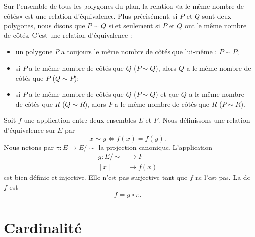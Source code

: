 \begin{example}     \label{EXooYDRVooHsANlC}
	Sur l'ensemble de tous les polygones du plan, la relation «a le même nombre de côtés» est une relation d'équivalence. Plus précisément, si \( P\) et \( Q\) sont deux polygones, nous disons que \( P\sim Q\) si et seulement si \( P\) et \( Q\) ont le même nombre de côtés. C'est une relation d'équivalence :
	\begin{itemize}
		\item
		      un polygone \( P\) a toujours le même nombre de côtés que lui-même : \( P\sim P\);
		\item
		      si \( P\) a le même nombre de côtés que \( Q\) (\( P\sim Q\)), alors \( Q\) a le même nombre de côtés que \( P\) (\( Q\sim P\));
		\item
		      si \( P\) a le même nombre de côtés que \( Q\) (\( P\sim Q\)) et que \( Q\) a le même nombre de côtés que \( R\) (\( Q\sim R\)), alors \( P\) a le même nombre de côtés que \( R\) (\( P\sim R\)).
	\end{itemize}
\end{example}

\begin{example}\label{EXooProjCanoniqueEquivAppl}
	Soit \( f\) une application entre deux ensembles \( E\) et \( F\). Nous définissons une relation d'équivalence sur \( E\) par
	\begin{equation}
		x\sim y\Leftrightarrow f(x)=f(y).
	\end{equation}
	Nous notons par \( \pi\colon E\to E/\sim\) la projection canonique. L'application
	\begin{equation}
		\begin{aligned}
			g\colon E/\sim & \to F        \\
			[x]            & \mapsto f(x)
		\end{aligned}
	\end{equation}
	est bien définie et injective. Elle n'est pas surjective tant que \( f\) ne l'est pas. La  de \( f\) est
	\begin{equation}
		f=g\circ\pi.
	\end{equation}
\end{example}

\section{Cardinalité}
\label{SECooCardinalite}


